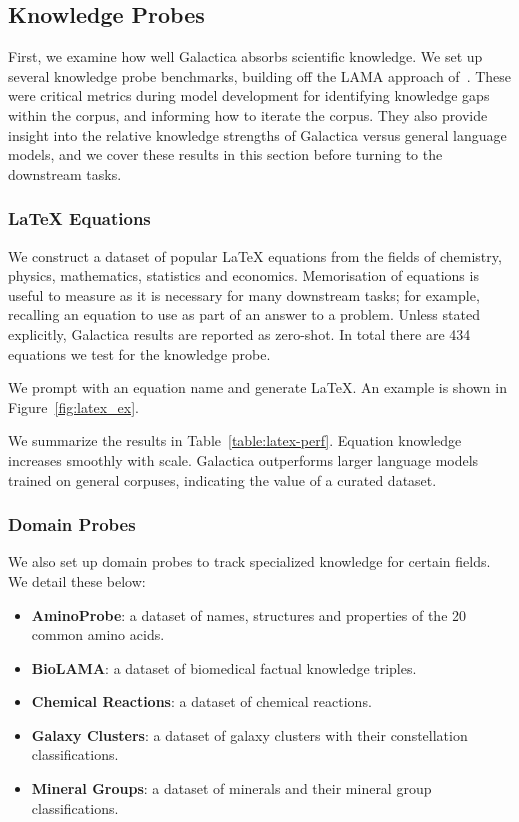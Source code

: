 \subsection{Knowledge Probes}

First, we examine how well Galactica absorbs scientific knowledge. We set up several knowledge probe benchmarks, building off the LAMA approach of~\citet{petroni2019language}. These were critical metrics during model development for identifying knowledge gaps within the corpus, and informing how to iterate the corpus. They also provide insight into the relative knowledge strengths of Galactica versus general language models, and we cover these results in this section before turning to the downstream tasks.

\subsubsection{LaTeX Equations}

We construct a dataset of popular LaTeX equations from the fields of chemistry, physics, mathematics, statistics and economics. Memorisation of equations is useful to measure as it is necessary for many downstream tasks; for example, recalling an equation to use as part of an answer to a problem. Unless stated explicitly, Galactica results are reported as zero-shot. In total there are 434 equations we test for the knowledge probe.

We prompt with an equation name and generate LaTeX. An example is shown in Figure~\ref{fig:latex_ex}.

We summarize the results in Table~\ref{table:latex-perf}. Equation knowledge increases smoothly with scale. Galactica outperforms larger language models trained on general corpuses, indicating the value of a curated dataset.

\subsubsection{Domain Probes}

We also set up domain probes to track specialized knowledge for certain fields. We detail these below:

\begin{itemize}
    \item \textbf{AminoProbe}: a dataset of names, structures and  properties of the 20 common amino acids.
    \item \textbf{BioLAMA}: a dataset of biomedical factual knowledge triples.
    \item \textbf{Chemical Reactions}: a dataset of chemical reactions.
    \item \textbf{Galaxy Clusters}: a dataset of galaxy clusters with their constellation classifications.
    \item \textbf{Mineral Groups}: a dataset of minerals and their mineral group classifications.
\end{itemize}

